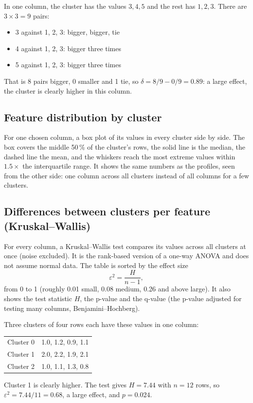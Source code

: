 \documentclass[11pt,a4paper]{article}
\begin{document}
\begin{example}
In one column, the cluster has the values $3, 4, 5$ and the rest has $1, 2, 3$. There are $3\times3=9$ pairs:

\begin{itemize}
  \item 3 against 1, 2, 3: bigger, bigger, tie
  \item 4 against 1, 2, 3: bigger three times
  \item 5 against 1, 2, 3: bigger three times
\end{itemize}

That is 8 pairs bigger, 0 smaller and 1 tie, so $\delta = 8/9 - 0/9 = 0.89$: a large effect, the cluster is clearly
higher in this column.
\end{example}

\subsection{Feature distribution by cluster}

For one chosen column, a box plot of its values in every cluster side by side. The box covers the middle 50\,\% of
the cluster's rows, the solid line is the median, the dashed line the mean, and the whiskers reach the most extreme
values within $1.5\times$ the interquartile range. It shows the same numbers as the profiles, seen from the other
side: one column across all clusters instead of all columns for a few clusters.

\subsection{Differences between clusters per feature (Kruskal--Wallis)}

For every column, a Kruskal--Wallis test compares its values across all clusters at once (noise excluded). It is
the rank-based version of a one-way ANOVA and does not assume normal data. The table is sorted by the effect size
\[
  \varepsilon^2 = \frac{H}{n-1},
\]
from 0 to 1 (roughly 0.01 small, 0.08 medium, 0.26 and above large). It also shows the test statistic $H$, the
p-value and the q-value (the p-value adjusted for testing many columns, Benjamini--Hochberg).

\begin{example}
Three clusters of four rows each have these values in one column:
\begin{center}
\begin{tabular}{ll}
\toprule
Cluster 0 & 1.0, 1.2, 0.9, 1.1\\
Cluster 1 & 2.0, 2.2, 1.9, 2.1\\
Cluster 2 & 1.0, 1.1, 1.3, 0.8\\
\bottomrule
\end{tabular}
\end{center}
Cluster 1 is clearly higher. The test gives $H = 7.44$ with $n = 12$ rows, so $\varepsilon^2 = 7.44/11 = 0.68$,
a large effect, and $p = 0.024$.
\end{example}
\end{document}
